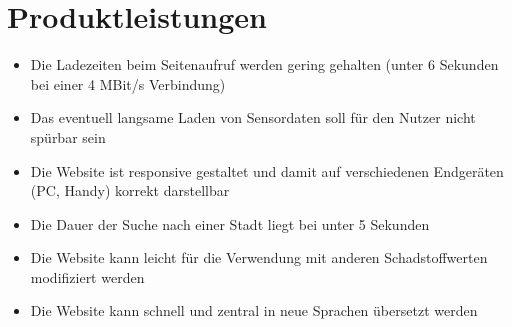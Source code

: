 \section{Produktleistungen}
\begin{itemize}
    \item Die Ladezeiten beim Seitenaufruf werden gering gehalten (unter 6 Sekunden bei einer 4 MBit/s Verbindung)
    \item Das eventuell langsame Laden von Sensordaten soll für den Nutzer nicht spürbar sein
    \item Die Website ist responsive gestaltet und damit auf verschiedenen Endgeräten (PC, Handy) korrekt darstellbar
    \item Die Dauer der Suche nach einer Stadt liegt bei unter 5 Sekunden
    \item Die Website kann leicht für die Verwendung mit anderen Schadstoffwerten modifiziert werden
    \item Die Website kann schnell und zentral in neue Sprachen übersetzt werden
\end{itemize}